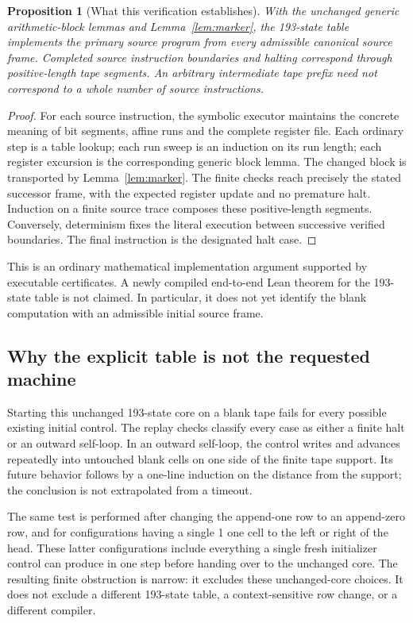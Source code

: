 \documentclass[11pt,letterpaper]{article}
\newtheorem{proposition}[theorem]{Proposition}
\begin{document}
\begin{proposition}[What this verification establishes]
With the unchanged generic arithmetic-block lemmas and
Lemma~\ref{lem:marker}, the 193-state table implements the primary source
program from every admissible canonical source frame. Completed source
instruction boundaries and halting correspond through positive-length
tape segments. An arbitrary intermediate tape prefix need not correspond
to a whole number of source instructions.
\end{proposition}
\begin{proof}
For each source instruction, the symbolic executor maintains the concrete
meaning of bit segments, affine runs and the complete register file. Each
ordinary step is a table lookup; each run sweep is an induction on its run
length; each register excursion is the corresponding generic block lemma.
The changed block is transported by Lemma~\ref{lem:marker}. The finite
checks reach precisely the stated successor frame, with the expected
register update and no premature halt. Induction on a finite source trace
composes these positive-length segments. Conversely, determinism fixes the
literal execution between successive verified boundaries. The final
instruction is the designated halt case.
\end{proof}

This is an ordinary mathematical implementation argument supported by
executable certificates. A newly compiled end-to-end Lean theorem for the
193-state table is not claimed. In particular, it does not yet identify the
blank computation with an admissible initial source frame.

\subsection{Why the explicit table is not the requested machine}

Starting this unchanged 193-state core on a blank tape fails for every
possible existing initial control. The replay checks classify every case
as either a finite halt or an outward self-loop. In an outward self-loop,
the control writes and advances repeatedly into untouched blank cells on
one side of the finite tape support. Its future behavior follows by a
one-line induction on the distance from the support; the conclusion is not
extrapolated from a timeout.

The same test is performed after changing the append-one row to an
append-zero row, and for configurations having a single 1 one cell to the
left or right of the head. These latter configurations include everything
a single fresh initializer control can produce in one step before handing
over to the unchanged core. The resulting finite obstruction is narrow:
it excludes these unchanged-core choices. It does not exclude a different
193-state table, a context-sensitive row change, or a different compiler.
\end{document}
